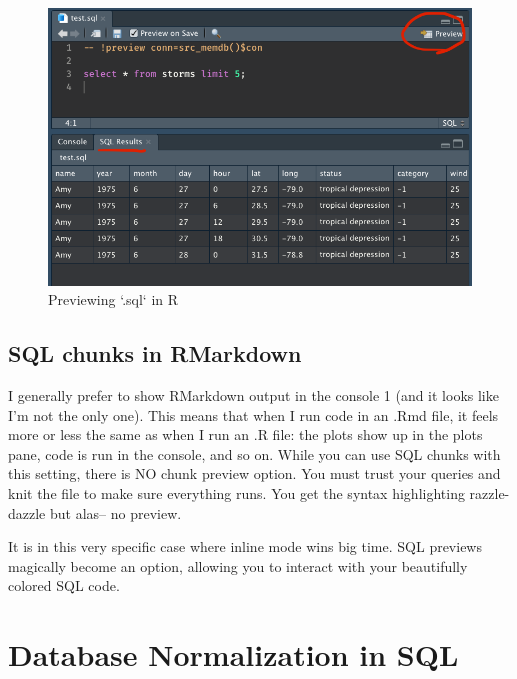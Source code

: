 \documentclass[
]{book}
\begin{document}
\begin{figure}

{\centering \includegraphics[width=1\linewidth]{./images/Bab3/sql-file-preview} 

}

\caption{Previewing `.sql` in R}\label{fig:unnamed-chunk-55}
\end{figure}

\hypertarget{sql-chunks-in-rmarkdown}{%
\section{SQL chunks in RMarkdown}\label{sql-chunks-in-rmarkdown}}

I generally prefer to show RMarkdown output in the console 1 (and it looks like I'm not the only one). This means that when I run code in an .Rmd file, it feels more or less the same as when I run an .R file: the plots show up in the plots pane, code is run in the console, and so on. While you can use SQL chunks with this setting, there is NO chunk preview option. You must trust your queries and knit the file to make sure everything runs. You get the syntax highlighting razzle-dazzle but alas-- no preview.

It is in this very specific case where inline mode wins big time. SQL previews magically become an option, allowing you to interact with your beautifully colored SQL code.

\hypertarget{database-normalization-in-sql}{%
\chapter{Database Normalization in SQL}\label{database-normalization-in-sql}}
\end{document}
